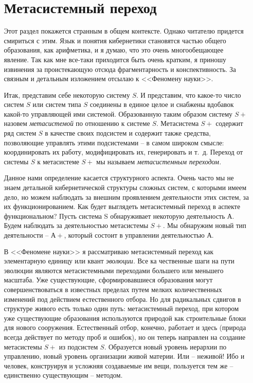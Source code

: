 \documentclass{book}
\begin{document}
\section{Метасистемный переход}

Этот раздел покажется странным в общем контексте. Однако читателю придется смириться с этим. Язык и понятия кибернетики 
становятся частью общего образования, как арифметика, и я думаю, что это очень многообещающее явление. Так как мне все-таки 
приходится быть очень кратким, я приношу извинения за проистекающую отсюда фрагментарность и кон­спективность. За связным и 
детальным изложением отсылаю к <<Феномену науки>>.

Итак, представим себе некоторую систему $S$. И представим, что какое-то число систем $S$ или систем типа $S$ соединены в еди­ное 
целое и снабжены вдобавок какой-то управляющей ими системой. Образованную таким образом систему $S+$ назовем 
\textit{метасистемой} по отношению к системе $S$. Метасистема $S+$ содержит ряд систем $S$ в качестве своих подсистем и содержит 
также средства, позволяющие управлять  этими подсистемами -- в самом широком смысле: координировать их работу, модифицировать 
их, генерировать и т.~д. Переход от системы $S$ к метасистеме $S+$ мы называем \textit{метасистемным переходом.} 

Данное нами определение касается структурного аспекта. Очень часто мы не знаем детальной кибернетической структу­ры сложных 
систем, с которыми имеем дело, но можем наблю­дать за внешним проявлением деятельности этих систем, за их функционированием. Как 
будет выглядеть метасистемный переход в аспекте функциональном? Пусть система S обнару­живает некоторую деятельность $А$. Будем 
наблюдать за дея­тельностью метасистемы $S+$. Мы обнаружим новый тип дея­тельности -- $А+$, который состоит в управлении 
деятельно­стью $А$.

В <<Феномене науки>> я рассматриваю метасистемный пере­ход как элементарную единицу или квант  \textit{эволюции.} Все ка­
чественные шаги на пути эволюции являются метасистемными переходами большего или меньшего масштаба. Уже сущест­вующие, 
сформировавшиеся образования могут совершенство­ваться в известных пределах путем мелких количественных изменений под действием 
естественного отбора. Но для ради­кальных сдвигов в структуре живого есть только один путь: метасистемный переход, при котором 
уже существующие образования используются природой как строительные блоки для нового сооружения. Естественный отбор, конечно, 
работает и здесь (природа всегда действует по методу проб и ошибок), но он теперь направлен на создание метасистемы $S+$ из 
подси­стем $S$. Образуется новый уровень иерархии по управлению, новый уровень организации живой материи. Или -- неживой! Ибо и 
человек, конструируя и усложняя создаваемые им вещи, пользуется тем же -- единственно существующим -- методом.
\end{document}
